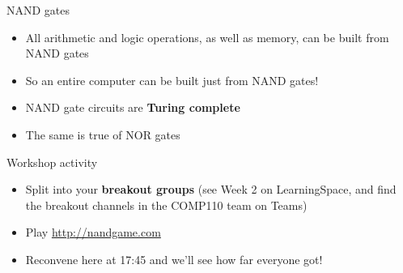\begin{frame}{NAND gates}
    \begin{itemize}
        \pause\item All arithmetic and logic operations, as well as memory, can be built from NAND gates
        \pause\item So an entire computer can be built just from NAND gates!
        \pause\item NAND gate circuits are \textbf{Turing complete}
        \pause\item The same is true of NOR gates
    \end{itemize}
\end{frame}

\begin{frame}{Workshop activity}
	\begin{itemize}
		\item Split into your \textbf{breakout groups} (see Week 2 on LearningSpace, and find the breakout channels in the COMP110 team on Teams)
		\item Play \url{http://nandgame.com}
		\item Reconvene here at 17:45 and we'll see how far everyone got!
	\end{itemize}
\end{frame}
